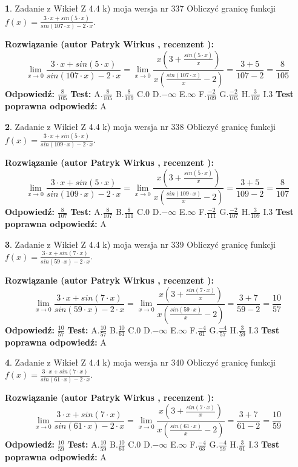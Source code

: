 \documentclass[12pt, a4paper]{article}
\theoremstyle{definition} %
\newtheorem{zad}{}
\newcommand{\zadStart}[1]{\begin{zad}#1\newline}
\newcommand{\zadStop}{\end{zad}}
\newcommand{\rozwStart}[2]{\noindent \textbf{Rozwiązanie (autor #1 , recenzent #2): }\newline}
\newcommand{\rozwStop}{\newline}
\newcommand{\odpStart}{\noindent \textbf{Odpowiedź:}\newline}
\newcommand{\odpStop}{\newline}
\newcommand{\testStart}{\noindent \textbf{Test:}\newline}
\newcommand{\testStop}{\newline}
\newcommand{\kluczStart}{\noindent \textbf{Test poprawna odpowiedź:}\newline}
\newcommand{\kluczStop}{\newline}
\begin{document}
\zadStart{Zadanie z Wikieł Z 4.4 k) moja wersja nr 337}
Obliczyć granicę funkcji $f(x)=\frac{3\cdot x +sin(5\cdot x)}{sin(107\cdot x) -2\cdot x}$.
\zadStop
\rozwStart{Patryk Wirkus}{}
$$\lim\limits_{x\to 0}\frac{3\cdot x +sin(5\cdot x)}{sin(107\cdot x) -2\cdot x}
=\lim\limits_{x\to 0}\frac{x(3+\frac{sin(5\cdot x)}{x})}{x(\frac{sin(107\cdot x)}{x}-2)}
=\frac{3+5}{107-2} = \frac{8}{105}$$
\rozwStop
\odpStart
$\frac{8}{105}$
\odpStop
\testStart
A.$\frac{8}{105}$
B.$\frac{8}{109}$
C.$0$
D.$-\infty$
E.$\infty$
F.$\frac{-2}{109}$
G.$\frac{-2}{105}$
H.$\frac{3}{107}$
I.$3$
\testStop
\kluczStart
A
\kluczStop



\zadStart{Zadanie z Wikieł Z 4.4 k) moja wersja nr 338}
Obliczyć granicę funkcji $f(x)=\frac{3\cdot x +sin(5\cdot x)}{sin(109\cdot x) -2\cdot x}$.
\zadStop
\rozwStart{Patryk Wirkus}{}
$$\lim\limits_{x\to 0}\frac{3\cdot x +sin(5\cdot x)}{sin(109\cdot x) -2\cdot x}
=\lim\limits_{x\to 0}\frac{x(3+\frac{sin(5\cdot x)}{x})}{x(\frac{sin(109\cdot x)}{x}-2)}
=\frac{3+5}{109-2} = \frac{8}{107}$$
\rozwStop
\odpStart
$\frac{8}{107}$
\odpStop
\testStart
A.$\frac{8}{107}$
B.$\frac{8}{111}$
C.$0$
D.$-\infty$
E.$\infty$
F.$\frac{-2}{111}$
G.$\frac{-2}{107}$
H.$\frac{3}{109}$
I.$3$
\testStop
\kluczStart
A
\kluczStop



\zadStart{Zadanie z Wikieł Z 4.4 k) moja wersja nr 339}
Obliczyć granicę funkcji $f(x)=\frac{3\cdot x +sin(7\cdot x)}{sin(59\cdot x) -2\cdot x}$.
\zadStop
\rozwStart{Patryk Wirkus}{}
$$\lim\limits_{x\to 0}\frac{3\cdot x +sin(7\cdot x)}{sin(59\cdot x) -2\cdot x}
=\lim\limits_{x\to 0}\frac{x(3+\frac{sin(7\cdot x)}{x})}{x(\frac{sin(59\cdot x)}{x}-2)}
=\frac{3+7}{59-2} = \frac{10}{57}$$
\rozwStop
\odpStart
$\frac{10}{57}$
\odpStop
\testStart
A.$\frac{10}{57}$
B.$\frac{10}{61}$
C.$0$
D.$-\infty$
E.$\infty$
F.$\frac{-4}{61}$
G.$\frac{-4}{57}$
H.$\frac{3}{59}$
I.$3$
\testStop
\kluczStart
A
\kluczStop



\zadStart{Zadanie z Wikieł Z 4.4 k) moja wersja nr 340}
Obliczyć granicę funkcji $f(x)=\frac{3\cdot x +sin(7\cdot x)}{sin(61\cdot x) -2\cdot x}$.
\zadStop
\rozwStart{Patryk Wirkus}{}
$$\lim\limits_{x\to 0}\frac{3\cdot x +sin(7\cdot x)}{sin(61\cdot x) -2\cdot x}
=\lim\limits_{x\to 0}\frac{x(3+\frac{sin(7\cdot x)}{x})}{x(\frac{sin(61\cdot x)}{x}-2)}
=\frac{3+7}{61-2} = \frac{10}{59}$$
\rozwStop
\odpStart
$\frac{10}{59}$
\odpStop
\testStart
A.$\frac{10}{59}$
B.$\frac{10}{63}$
C.$0$
D.$-\infty$
E.$\infty$
F.$\frac{-4}{63}$
G.$\frac{-4}{59}$
H.$\frac{3}{61}$
I.$3$
\testStop
\kluczStart
A
\kluczStop
\end{document}

